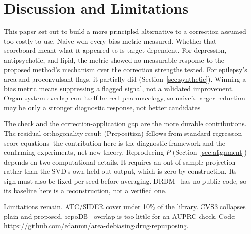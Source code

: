 \documentclass{llncs}
\begin{document}
\section{Discussion and Limitations}
This paper set out to build a more principled alternative to a correction assumed too costly to use. Naive won every bias metric measured. Whether that scoreboard meant what it appeared to is target-dependent. For depression, antipsychotic, and lipid, the metric showed no measurable response to the proposed method's mechanism over the correction strengths tested. For epilepsy's area and proconvulsant flags, it partially did (Section~\ref{sec:synthetic}). Winning a bias metric means suppressing a flagged signal, not a validated improvement. Organ-system overlap can itself be real pharmacology, so naive's larger reduction may be only a stronger diagnostic response, not better candidates.

The check and the correction-application gap are the more durable contributions. The residual-orthogonality result (Proposition) follows from standard regression score equations; the contribution here is the diagnostic framework and the confirming experiments, not new theory. Reproducing $P$ (Section~\ref{sec:alignment}) depends on two computational details. It requires an out-of-sample projection rather than the SVD's own held-out output, which is zero by construction. Its sign must also be fixed per seed before averaging. DRDM~\cite{meng2025drdmb} has no public code, so its baseline here is a reconstruction, not a verified one.

Limitations remain. ATC/SIDER cover under 10\% of the library. CVS3 collapses plain and proposed. repoDB~\cite{brown2017repodb} overlap is too little for an AUPRC check. Code: \url{https://github.com/edanmn/area-debiasing-drug-repurposing}.



\end{document}

